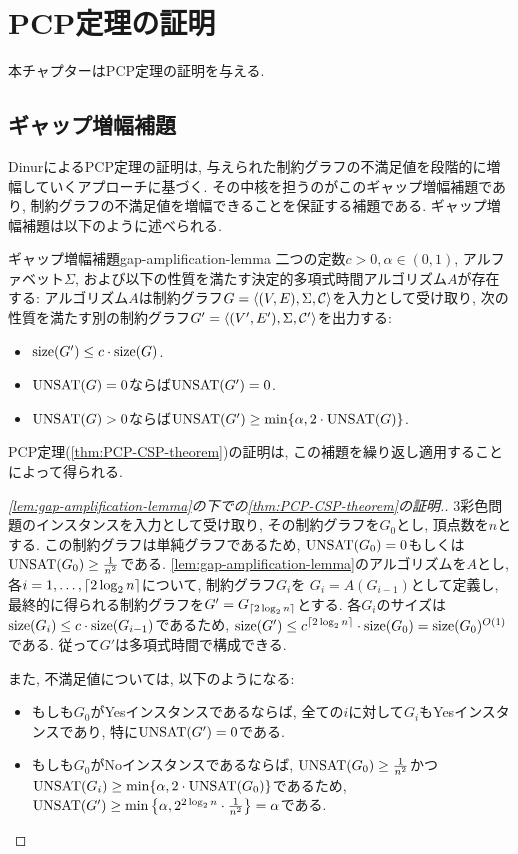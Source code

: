 \chapter{PCP定理の証明} \label{chap:PCP-proof}

本チャプターはPCP定理の証明を与える.

\section{ギャップ増幅補題}
DinurによるPCP定理の証明は, 与えられた制約グラフの不満足値を段階的に増幅していくアプローチに基づく.
その中核を担うのがこのギャップ増幅補題であり, 制約グラフの不満足値を増幅できることを保証する補題である.
ギャップ増幅補題は以下のように述べられる.

\begin{lemma}{ギャップ増幅補題}{gap-amplification-lemma}
  二つの定数$c>0,\alpha\in (0,1)$, アルファベット$\Sigma$, および以下の性質を満たす決定的多項式時間アルゴリズム$A$が存在する: 
  アルゴリズム$A$は制約グラフ$G=\langle(V,E),\Sigma,\mathcal{C}\rangle$を入力として受け取り, 次の性質を満たす別の制約グラフ$G'=\langle(V',E'),\Sigma,\mathcal{C}'\rangle$を出力する:
  \begin{itemize}
    \item $\mathrm{size}(G')\le c\cdot \mathrm{size}(G)$.
    \item $\mathrm{UNSAT}(G)=0$ならば$\mathrm{UNSAT}(G')=0$.
    \item $\mathrm{UNSAT}(G)>0$ならば$\mathrm{UNSAT}(G')\ge \min\{\alpha, 2\cdot \mathrm{UNSAT}(G)\}$.
  \end{itemize}
\end{lemma}

PCP定理(\cref{thm:PCP-CSP-theorem})の証明は, この補題を繰り返し適用することによって得られる.

\begin{proof}[\cref{lem:gap-amplification-lemma}の下での\cref{thm:PCP-CSP-theorem}の証明.]
  3彩色問題のインスタンスを入力として受け取り, その制約グラフを$G_0$とし, 頂点数を$n$とする.
  この制約グラフは単純グラフであるため, $\mathrm{UNSAT}(G_0)=0$もしくは$\mathrm{UNSAT}(G_0)\ge \frac{1}{n^2}$である.
  \cref{lem:gap-amplification-lemma}のアルゴリズムを$A$とし, 各$i=1,\dots,\lceil2\log_2 n\rceil$について, 制約グラフ$G_i$を
  $G_i = A(G_{i-1})$として定義し, 最終的に得られる制約グラフを$G'=G_{\lceil2\log_2 n\rceil}$とする.
  各$G_i$のサイズは$\mathrm{size}(G_i) \le c\cdot \mathrm{size}(G_{i-1})$であるため, $\mathrm{size}(G')\le c^{\lceil2\log_2 n\rceil}\cdot \mathrm{size}(G_0)=\mathrm{size}(G_0)^{O(1)}$である.
  従って$G'$は多項式時間で構成できる.

  また, 不満足値については, 以下のようになる:
  \begin{itemize}
  \item もしも$G_0$がYesインスタンスであるならば, 全ての$i$に対して$G_i$もYesインスタンスであり, 特に$\mathrm{UNSAT}(G')=0$である.
  \item もしも$G_0$がNoインスタンスであるならば, $\mathrm{UNSAT}(G_0)\ge \frac{1}{n^2}$かつ$\mathrm{UNSAT}(G_i)\ge \min\{\alpha, 2\cdot \mathrm{UNSAT}(G_0)\}$であるため, $\mathrm{UNSAT}(G')\ge \min\qty{\alpha, 2^{2\log_2 n}\cdot \frac{1}{n^2}}=\alpha$である.
  \end{itemize}
\end{proof}


